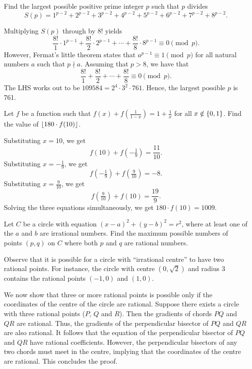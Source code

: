 \begin{question}[761]\label{A::2024-O-1-19}
    Find the largest possible positive prime integer $p$ such that $p$ divides \[S(p) = 1^{p-2} + 2^{p-2} + 3^{p-2} + 4^{p-2} + 5^{p-2} + 6^{p-2} + 7^{p-2} + 8^{p-2}.\]
\end{question}

Multiplying $S(p)$ through by $8!$ yields \[\frac{8!}{1} \cdot 1^{p-1} + \frac{8!}{2} \cdot 2^{p-1} + \cdots + \frac{8!}{8} \cdot 8^{p-1}\equiv 0 \pmod{p}.\] However, Fermat's little theorem states that $a^{p-1} \equiv 1 \pmod{p}$ for all natural numbers $a$ such that $p \nmid a$. Assuming that $p > 8$, we have that \[\frac{8!}{1} + \frac{8!}{2} + \cdots + \frac{8!}{8} \equiv 0 \pmod{p}.\] The LHS works out to be $109584 = 2^4 \cdot 3^2 \cdot 761$. Hence, the largest possible $p$ is 761.

\begin{question}[1009]\label{A::2024-O-1-20}
    Let $f$ be a function such that $f(x) + f(\frac{1}{1-x}) = 1 + \frac1x$ for all $x \notin \left\lbrace 0, 1 \right\rbrace$. Find the value of $\left\lfloor 180 \cdot f(10) \right\rfloor$.
\end{question}

Substituting $x = 10$, we get \[f(10) + f(-\tfrac19) = \frac{11}{10}.\] Substituting $x = -\frac19$, we get \[f(-\tfrac19) + f(\tfrac9{10}) = -8.\] Substituting $x = \frac9{10}$, we get \[f(\tfrac9{10}) + f(10) = \frac{19}9.\] Solving the three equations simultaneously, we get $180 \cdot f(10) = 1009$.

\begin{question}[2]\label{A::2024-O-1-21}
    Let $C$ be a circle with equation $(x-a)^2 + (y-b)^2 = r^2$, where at least one of the $a$ and $b$ are irrational numbers. Find the maximum possible numbers of points $(p,q)$ on $C$ where both $p$ and $q$ are rational numbers.
\end{question}

Observe that it is possible for a circle with ``irrational centre'' to have two rational points. For instance, the circle with centre $(0, \sqrt2)$ and radius 3 contains the rational points $(-1, 0)$ and $(1, 0)$. 

We now show that three or more rational points is possible only if the coordinates of the centre of the circle are rational. Suppose there exists a circle with three rational points ($P$, $Q$ and $R$). Then the gradients of chords $PQ$ and $QR$ are rational. Thus, the gradients of the perpendicular bisector of $PQ$ and $QR$ are also rational. It follows that the equation of the perpendicular bisector of $PQ$ and $QR$ have rational coefficients. However, the perpendicular bisectors of any two chords must meet in the centre, implying that the coordinates of the centre are rational. This concludes the proof.

